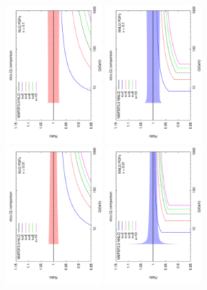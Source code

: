 \documentclass[letter,11pt]{article}
\begin{document}
%
%
\begin{figure}[t]
\centering
\includegraphics[width=0.33\textwidth,angle=-90]{./bottom_ratio_kb_nlo_x_01.pdf}
\includegraphics[width=0.33\textwidth,angle=-90]{./bottom_ratio_kb_nnlo_x_01.pdf}
\includegraphics[width=0.33\textwidth,angle=-90]{./bottom_ratio_kb_nlo_x_001.pdf}
\includegraphics[width=0.33\textwidth,angle=-90]{./bottom_ratio_kb_nnlo_x_001.pdf}

\end{figure}
\end{document}
